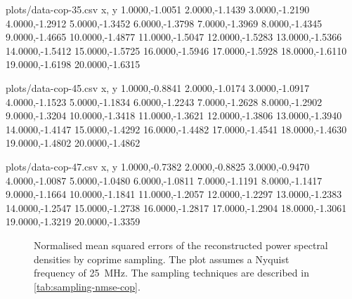 \documentclass[a4paper, openany, oneside]{memoir}
\begin{document}


\begin{filecontents*}{plots/data-cop-35.csv}
x, y
1.0000,-1.0051
2.0000,-1.1439
3.0000,-1.2190
4.0000,-1.2912
5.0000,-1.3452
6.0000,-1.3798
7.0000,-1.3969
8.0000,-1.4345
9.0000,-1.4665
10.0000,-1.4877
11.0000,-1.5047
12.0000,-1.5283
13.0000,-1.5366
14.0000,-1.5412
15.0000,-1.5725
16.0000,-1.5946
17.0000,-1.5928
18.0000,-1.6110
19.0000,-1.6198
20.0000,-1.6315
\end{filecontents*}

\begin{filecontents*}{plots/data-cop-45.csv}
x, y
1.0000,-0.8841
2.0000,-1.0174
3.0000,-1.0917
4.0000,-1.1523
5.0000,-1.1834
6.0000,-1.2243
7.0000,-1.2628
8.0000,-1.2902
9.0000,-1.3204
10.0000,-1.3418
11.0000,-1.3621
12.0000,-1.3806
13.0000,-1.3940
14.0000,-1.4147
15.0000,-1.4292
16.0000,-1.4482
17.0000,-1.4541
18.0000,-1.4630
19.0000,-1.4802
20.0000,-1.4862
\end{filecontents*}

\begin{filecontents*}{plots/data-cop-47.csv}
x, y
1.0000,-0.7382
2.0000,-0.8825
3.0000,-0.9470
4.0000,-1.0087
5.0000,-1.0480
6.0000,-1.0811
7.0000,-1.1191
8.0000,-1.1417
9.0000,-1.1664
10.0000,-1.1841
11.0000,-1.2057
12.0000,-1.2297
13.0000,-1.2383
14.0000,-1.2547
15.0000,-1.2738
16.0000,-1.2817
17.0000,-1.2904
18.0000,-1.3061
19.0000,-1.3219
20.0000,-1.3359
\end{filecontents*}

\begin{figure}
	\centering
	\caption{Normalised mean squared errors of the reconstructed power spectral densities by coprime sampling. The plot assumes a Nyquist frequency of \SI{25}{MHz}. The sampling techniques are described in \cref{tab:sampling-nmse-cop}.}
	\label{fig:plot-nmse-cop}
\end{figure}
\end{document}
